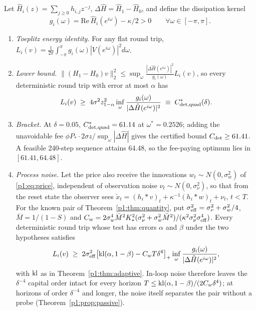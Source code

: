 \begin{theorem}\label{p1:thm:spectral}
Let $\hat H_i(z)=\sum_{j\ge0}h_{i,j}z^{-j}$, $\Delta\hat H=\hat H_1-\hat H_0$, and define the dissipation kernel
\begin{equation}\label{p1:eq:gdiss}
g_i(\omega)=\mathrm{Re}\,\hat H_i(e^{i\omega})-\kappa/2>0\qquad\forall\omega\in[-\pi,\pi].
\end{equation}
\begin{enumerate}[label=(\roman*)]
\item \emph{Toeplitz energy identity.} For any flat round trip, $L_i(v)=\frac1{2\pi}\int_{-\pi}^{\pi}g_i(\omega)|V(e^{i\omega})|^2d\omega$.
\item \emph{Lower bound.} $\|(H_1-H_0)v\|_2^2\le\sup_\omega\frac{|\Delta\hat H(e^{i\omega})|^2}{g_i(\omega)}L_i(v)$, so every deterministic round trip with error at most $\alpha$ has
\begin{equation}\label{p1:eq:Cdet}
L_i(v)\;\ge\;4\sigma^2z_{1-\alpha}^2\inf_\omega\frac{g_i(\omega)}{|\Delta\hat H(e^{i\omega})|^2}\;\equiv\;C^*_{\rm det,quad}(\delta).
\end{equation}
\item \emph{Bracket.} At $\delta=0.05$, $C^*_{\rm det,quad}=61.14$ at $\omega^*=0.2526$; adding the unavoidable fee $\phi P_*\cdot2\sigma z/\sup_\omega|\Delta\hat H|$ gives the certified bound $C_{\rm det}\ge61.41$. A feasible 240-step sequence attains 64.48, so the fee-paying optimum lies in $[61.41,64.48]$.
\item \emph{Process noise.} Let the price also receive the innovations $w_t\sim N(0,\sigma_w^2)$ of \eqref{p1:eq:price}, independent of observation noise $\nu_t\sim N(0,\sigma_\nu^2)$, so that from the reset state the observer sees $\tilde x_t=(h_i*v)_t+\kappa^{-1}(h_i*w)_t+\nu_t$, $t<T$. For the known pair of Theorem~\ref{p1:thm:quantity}, put $\sigma_{\rm eff}^2=\sigma_\nu^2+\sigma_w^2/4$, $\bar M=1/(1-S)$ and $C_w=2\sigma_w^4\bar M^2K_*^2(\sigma_\nu^2+\sigma_w^2\bar M^2)/(\kappa^2\sigma_\nu^2\sigma_{\rm eff}^4)$. Every deterministic round trip whose test has errors $\alpha$ and $\beta$ under the two hypotheses satisfies
\begin{equation}\label{p1:eq:Cnoise}
L_i(v)\;\ge\;2\sigma_{\rm eff}^2\bigl[{\rm kl}(\alpha,1-\beta)-C_wT\delta^4\bigr]_+\inf_\omega\frac{g_i(\omega)}{|\Delta\hat H(e^{i\omega})|^2},
\end{equation}
with ${\rm kl}$ as in Theorem~\ref{p1:thm:adaptive}. In-loop noise therefore leaves the $\delta^{-4}$ capital order intact for every horizon $T\le{\rm kl}(\alpha,1-\beta)/(2C_w\delta^4)$; at horizons of order $\delta^{-4}$ and longer, the noise itself separates the pair without a probe (Theorem~\ref{p1:prop:passive}).
\end{enumerate}
\end{theorem}

